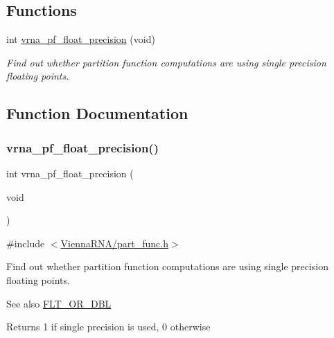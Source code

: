 \subsection*{Functions}
\begin{DoxyCompactItemize}
\item 
int \mbox{\hyperlink{group__pf__fold_gad2b3594f0b50b68029e0f54fdce59313}{vrna\+\_\+pf\+\_\+float\+\_\+precision}} (void)
\begin{DoxyCompactList}\small\item\em Find out whether partition function computations are using single precision floating points. \end{DoxyCompactList}\end{DoxyCompactItemize}


\subsection{Function Documentation}
\mbox{\label{group__pf__fold_gad2b3594f0b50b68029e0f54fdce59313}} 
\subsubsection{\texorpdfstring{vrna\_pf\_float\_precision()}{vrna\_pf\_float\_precision()}}
{\footnotesize\ttfamily int vrna\+\_\+pf\+\_\+float\+\_\+precision (\begin{DoxyParamCaption}\item[{void}]{ }\end{DoxyParamCaption})}



{\ttfamily \#include $<$\mbox{\hyperlink{part__func_8h}{Vienna\+R\+N\+A/part\+\_\+func.\+h}}$>$}



Find out whether partition function computations are using single precision floating points. 

\begin{DoxySeeAlso}{See also}
\mbox{\hyperlink{group__data__structures_ga31125aeace516926bf7f251f759b6126}{F\+L\+T\+\_\+\+O\+R\+\_\+\+D\+BL}} 
\end{DoxySeeAlso}
\begin{DoxyReturn}{Returns}
1 if single precision is used, 0 otherwise 
\end{DoxyReturn}
